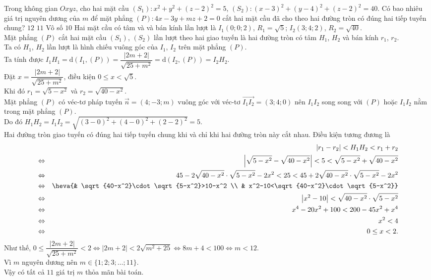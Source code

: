 \begin{ex}%
	Trong không gian $Oxyz$, cho hai mặt cầu $(S_1)\colon x^2+y^2+(z-2)^2=5$, $(S_2)\colon (x-3)^2+(y-4)^2+(z-2)^2=40$. Có bao nhiêu giá trị nguyên dương của $m$ để mặt phẳng $(P)\colon 4x-3y+mz+2=0$ cắt hai mặt cầu đã cho theo hai đường tròn có đúng hai tiếp tuyến chung?
	\choice
	{$12$}
	{\True $11$}
	{Vô số}
	{$10$}
	\loigiai
	{Hai mặt cầu có tâm và và bán kính lần lượt là $I_1(0;0;2)$, $R_1=\sqrt{5}$; $I_2(3;4;2)$, $R_2=\sqrt{40}$.\\
	Mặt phẳng $(P)$ cắt hai mặt cầu $(S_1)$, $(S_2)$ lần lượt theo hai giao tuyến là hai đường tròn có tâm $H_1$, $H_2$ và bán kính $r_1$, $r_2$.\\
	Ta có $H_1$, $H_2$ lần lượt là hình chiếu vuông góc của $I_1$, $I_2$ trên mặt phẳng $(P)$.\\
	Ta tính được $I_1H_1=\mathrm{d}\left(I_1,(P)\right)=\dfrac{|2m+2|}{\sqrt{25+m^2}}=\mathrm{d}\left(I_2,(P)\right)=I_2H_2$.\\
	Đặt $x=\dfrac{|2m+2|}{\sqrt{25+m^2}}$, điều kiện $0\leq x<\sqrt{5}$.\\
	Khi đó $r_1=\sqrt{5-x^2}$ và $r_2=\sqrt{40-x^2}$.\\
	Mặt phẳng $(P)$ có véc-tơ pháp tuyến $\overrightarrow{n}=(4;-3;m)$ vuông góc với véc-tơ $\overrightarrow{I_1 I_2}=(3;4;0)$ nên $I_1I_2$ song song với $(P)$ hoặc $I_1I_2$ nằm trong mặt phẳng $(P)$.\\
	Do đó $H_1H_2=I_1I_2=\sqrt{(3-0)^2+(4-0)^2+(2-2)^2}=5$.\\
	Hai đường tròn giao tuyến có đúng hai tiếp tuyến chung khi và chỉ khi hai đường tròn này cắt nhau. Điều kiện tương đương là \allowdisplaybreaks\begin{eqnarray*}
	&&\left|r_1-r_2\right|<H_1H_2<r_1+r_2\\
	&\Leftrightarrow & \left|\sqrt{5-x^2}-\sqrt{40-x^2}\right|<5<\sqrt{5-x^2}+\sqrt{40-x^2}\\
	&\Leftrightarrow & 45-2\sqrt{40-x^2}\cdot\sqrt{5-x^2}-2x^2<25<45+2\sqrt{40-x^2}\cdot\sqrt{5-x^2}-2x^2\\
	&\Leftrightarrow &\heva{& \sqrt{40-x^2}\cdot\sqrt{5-x^2}>10-x^2 \\ & x^2-10<\sqrt{40-x^2}\cdot\sqrt{5-x^2}}\\
	&\Leftrightarrow & \left|x^2-10\right|<\sqrt{40-x^2}\cdot\sqrt{5-x^2}\\
	&\Leftrightarrow & x^4-20x^2+100<200-45x^2+x^4\\
	&\Leftrightarrow & x^2<4\\
	&\Leftrightarrow & 0\leq x<2.
	\end{eqnarray*}
	Như thế, $0\leq \dfrac{|2m+2|}{\sqrt{25+m^2}}<2\Leftrightarrow |2m+2|<2\sqrt{m^2+25}\Leftrightarrow 8m+4<100\Leftrightarrow m<12$.\\
	Vì $m$ nguyên dương nên $m\in\{1;2;3;\ldots;11\}$.\\
	Vậy có tất cả $11$ giá trị $m$ thỏa mãn bài toán.
	}
\end{ex}

